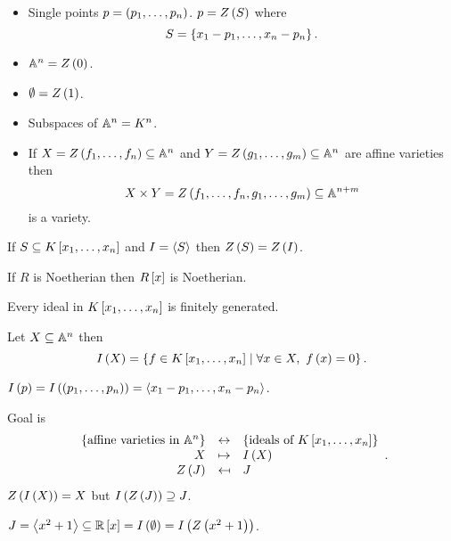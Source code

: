 \begin{example1}
\hfill
\begin{itemize}
\item Single points $ p = \rb{p_1, \dots, p_n} $. $ p = Z\rb{S} $ where
$$ S = \cb{x_1 - p_1, \dots, x_n - p_n}. $$
\item $ \A^n = Z\rb{0} $.
\item $ \emptyset = Z\rb{1} $.
\item Subspaces of $ \A^n = K^n $.
\item If $ X = Z\rb{f_1, \dots, f_n} \subseteq \A^n $ and $ Y = Z\rb{g_1, \dots, g_m} \subseteq \A^n $ are affine varieties then
$$ X \times Y = Z\rb{f_1, \dots, f_n, g_1, \dots, g_m} \subseteq \A^{n + m} $$
is a variety.
\end{itemize}
\end{example1}

\begin{remark1}
If $ S \subseteq K\sb{x_1, \dots, x_n} $ and $ I = \ab{S} $ then $ Z\rb{S} = Z\rb{I} $.
\end{remark1}

\begin{theorem}
If $ R $ is Noetherian then $ R\sb{x} $ is Noetherian.
\end{theorem}

\begin{corollary}
Every ideal in $ K\sb{x_1, \dots, x_n} $ is finitely generated.
\end{corollary}

\begin{definition}
Let $ X \subseteq \A^n $ then
$$ I\rb{X} = \cb{f \in K\sb{x_1, \dots, x_n} \mid \forall x \in X, \ f\rb{x} = 0}. $$
\end{definition}

\begin{example1}
$ I\rb{p} = I\rb{\rb{p_1, \dots, p_n}} = \ab{x_1 - p_1, \dots, x_n - p_n} $.
\end{example1}

Goal is
$$
\begin{array}{rcl}
\cb{\text{affine varieties in} \ \A^n} & \leftrightarrow & \cb{\text{ideals of} \ K\sb{x_1, \dots, x_n}} \\
X & \mapsto & I\rb{X} \\
Z\rb{J} & \mapsfrom & J
\end{array}.
$$
$ Z\rb{I\rb{X}} = X $ but $ I\rb{Z\rb{J}} \supseteq J $.

\begin{example1}
$ J = \ab{x^2 + 1} \subseteq \R\sb{x} = I\rb{\emptyset} = I\rb{Z\rb{x^2 + 1}} $.
\end{example1}

